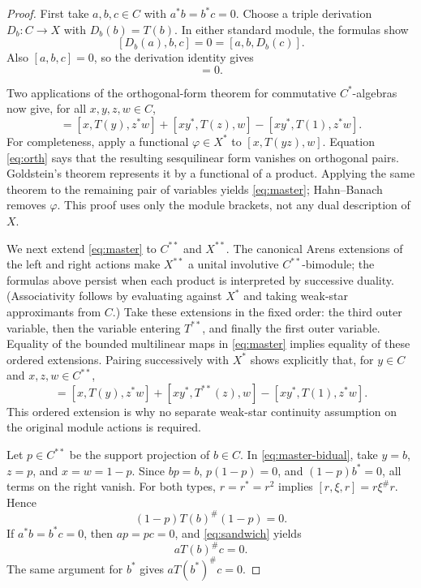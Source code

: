 \documentclass[11pt]{article}
\begin{document}
\begin{proof}
First take $a,b,c\in C$ with $a^*b=b^*c=0$.  Choose a triple
derivation $D_b:C\to X$ with $D_b(b)=T(b)$.  In either standard module,
the formulas show
\[
 [D_b(a),b,c]=0=[a,b,D_b(c)].
\]
Also $[a,b,c]=0$, so the derivation identity gives
\begin{equation}
 [a,T(b),c]=0. \label{eq:orth}
\end{equation}

Two applications of the orthogonal-form theorem for commutative
$C^*$-algebras now give, for all $x,y,z,w\in C$,
\begin{equation}
 [x,T(yz),w]=[x,T(y),z^*w]+[xy^*,T(z),w]
              -[xy^*,T(1),z^*w]. \label{eq:master}
\end{equation}
For completeness, apply a functional $\varphi\in X^*$ to
$[x,T(yz),w]$.  Equation \eqref{eq:orth} says that the resulting
sesquilinear form vanishes on orthogonal pairs.  Goldstein's theorem
represents it by a functional of a product.  Applying the same theorem to
the remaining pair of variables yields \eqref{eq:master}; Hahn--Banach
removes $\varphi$.  This proof uses only the module brackets, not any dual
description of $X$.

We next extend \eqref{eq:master} to $C^{**}$ and $X^{**}$.  The canonical
Arens extensions of the left and right actions make $X^{**}$ a unital
involutive $C^{**}$-bimodule; the formulas above persist when each product
is interpreted by successive duality.  (Associativity follows by evaluating
against $X^*$ and taking weak-star approximants from $C$.)  Take these
extensions in the fixed order: the third outer variable, then the variable
entering $T^{**}$, and finally the first outer variable.
Equality of the bounded multilinear maps in \eqref{eq:master} implies
equality of these ordered extensions.  Pairing successively with $X^*$
shows explicitly that, for $y\in C$ and $x,z,w\in C^{**}$,
\begin{equation}
 [x,T^{**}(yz),w]=[x,T(y),z^*w]+[xy^*,T^{**}(z),w]
              -[xy^*,T(1),z^*w]. \label{eq:master-bidual}
\end{equation}
This ordered extension is why no separate weak-star continuity assumption
on the original module actions is required.

Let $p\in C^{**}$ be the support projection of $b\in C$.  In
\eqref{eq:master-bidual}, take $y=b$, $z=p$, and $x=w=1-p$.  Since
$bp=b$, $p(1-p)=0$, and $(1-p)b^*=0$, all terms on the right vanish.
For both types, $r=r^*=r^2$ implies $[r,\xi,r]=r\xi^\#r$.  Hence
\begin{equation}
 (1-p)T(b)^\#(1-p)=0. \label{eq:sandwich}
\end{equation}
If $a^*b=b^*c=0$, then $ap=pc=0$, and \eqref{eq:sandwich} yields
\begin{equation}
 aT(b)^\#c=0. \label{eq:zero1}
\end{equation}
The same argument for $b^*$ gives $aT(b^*)^\#c=0$.


\end{proof}
\end{document}
